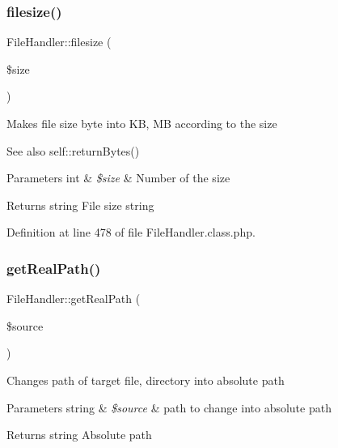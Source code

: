 \hypertarget{classFileHandler_ae235b4ded589fb13caed260fabc0a30c}{}\label{classFileHandler_ae235b4ded589fb13caed260fabc0a30c} 
\subsubsection{\texorpdfstring{filesize()}{filesize()}}
{\footnotesize\ttfamily File\+Handler\+::filesize (\begin{DoxyParamCaption}\item[{}]{\$size }\end{DoxyParamCaption})}

Makes file size byte into KB, MB according to the size

\begin{DoxySeeAlso}{See also}
self\+::return\+Bytes() 
\end{DoxySeeAlso}

\begin{DoxyParams}[1]{Parameters}
int & {\em \$size} & Number of the size \\
\hline
\end{DoxyParams}
\begin{DoxyReturn}{Returns}
string File size string 
\end{DoxyReturn}


Definition at line 478 of file File\+Handler.\+class.\+php.

\hypertarget{classFileHandler_a6370b3eeddb705be04d9f60902a746e0}{}\label{classFileHandler_a6370b3eeddb705be04d9f60902a746e0} 
\subsubsection{\texorpdfstring{get\+Real\+Path()}{getRealPath()}}
{\footnotesize\ttfamily File\+Handler\+::get\+Real\+Path (\begin{DoxyParamCaption}\item[{}]{\$source }\end{DoxyParamCaption})}

Changes path of target file, directory into absolute path


\begin{DoxyParams}[1]{Parameters}
string & {\em \$source} & path to change into absolute path \\
\hline
\end{DoxyParams}
\begin{DoxyReturn}{Returns}
string Absolute path 
\end{DoxyReturn}


